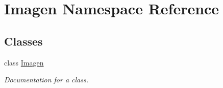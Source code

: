 \hypertarget{namespace_imagen}{}\section{Imagen Namespace Reference}
\label{namespace_imagen}
\subsection*{Classes}
\begin{DoxyCompactItemize}
\item 
class \mbox{\hyperlink{class_imagen_1_1_imagen}{Imagen}}
\begin{DoxyCompactList}\small\item\em Documentation for a class. \end{DoxyCompactList}\end{DoxyCompactItemize}
